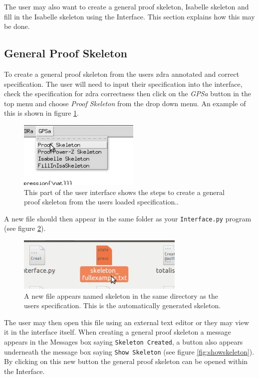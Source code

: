 The user may also want to create a general proof skeleton, Isabelle skeleton and
fill in the Isabelle skeleton using the Interface. This section explains how
this may be done.

\subsection{General Proof Skeleton}

To create a general proof skeleton from the users \gls{zdra} annotated and
correct specification. The user will need to input their specification into the
interface, check the specification for \gls{zdra} correctness then click on the
\emph{GPSa} button in the top menu and choose \emph{Proof Skeleton} from the
drop down menu. An example of this is shown in figure \ref{fig:gpsabutton}.

\begin{figure}[H]
\centering
\includegraphics[scale=0.8]{Figures/Interface/proofskeleton.png}
\caption{This part of the user interface shows the steps to create a general proof skeleton from the users loaded specification.. \label{fig:gpsabutton}}
\end{figure}

A new file should then appear in the same folder as your \texttt{Interface.py}
program (see figure \ref{fig:gpsadoc}).

\begin{figure}[H]
\centering
\includegraphics[scale=0.6]{Figures/Interface/skeletondoc.png}
\caption{A new file appears named skeleton in the same directory as the users specification. This is the automatically generated skeleton. \label{fig:gpsadoc}}
\end{figure}

The user may then open this file using an external text editor or they may view
it in the interface itself. When creating a general proof skeleton a message
appears in the Messages box saying \texttt{Skeleton Created}, a button also
appears underneath the message box saying \texttt{Show Skeleton} (see figure
\ref{fig:showskeleton}). By clicking on this new button the general proof
skeleton can be opened within the Interface. 

